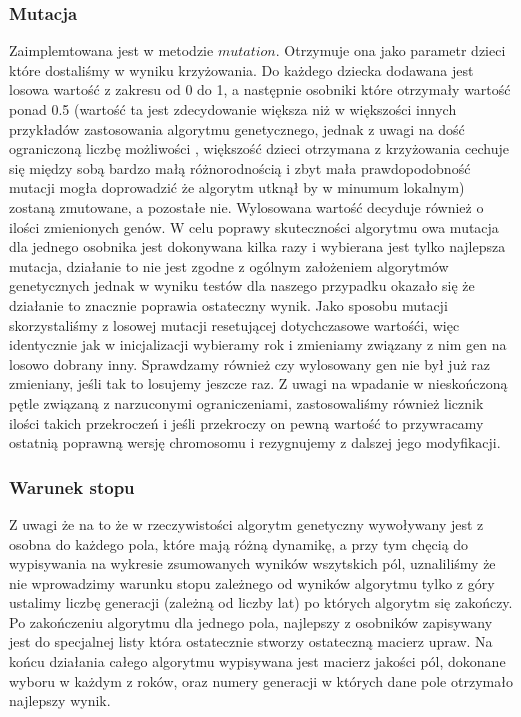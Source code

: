 \documentclass{article}
\begin{document}
\subsubsection{Mutacja}
Zaimplemtowana jest w metodzie $mutation$. Otrzymuje ona jako parametr dzieci  które dostaliśmy w wyniku krzyżowania. Do każdego dziecka dodawana jest losowa wartość z zakresu od 0 do 1, a następnie osobniki które otrzymały wartość ponad 0.5 (wartość ta jest zdecydowanie większa niż w większości innych przykładów zastosowania algorytmu genetycznego, jednak z uwagi na dość ograniczoną liczbę możliwości , większość dzieci otrzymana z krzyżowania cechuje się między sobą bardzo małą różnorodnością i zbyt mała prawdopodobność mutacji mogła doprowadzić że algorytm utknął by w minumum lokalnym)  zostaną zmutowane, a pozostałe nie. Wylosowana wartość decyduje również o ilości zmienionych genów. W celu poprawy skuteczności algorytmu owa mutacja dla jednego osobnika jest dokonywana kilka razy i wybierana jest tylko najlepsza mutacja, działanie to nie jest zgodne z ogólnym założeniem algorytmów genetycznych jednak w wyniku testów dla naszego przypadku okazało się że działanie to znacznie poprawia ostateczny wynik. Jako sposobu mutacji skorzystaliśmy z losowej mutacji resetującej dotychczasowe wartośći, więc identycznie jak w inicjalizacji wybieramy rok i zmieniamy związany z nim gen na losowo dobrany inny. Sprawdzamy również czy wylosowany gen nie był już raz zmieniany, jeśli tak to losujemy jeszcze raz. Z uwagi na wpadanie w nieskończoną pętle związaną z narzuconymi ograniczeniami, zastosowaliśmy również licznik ilości takich przekroczeń i jeśli przekroczy on pewną wartość to przywracamy ostatnią poprawną wersję chromosomu i rezygnujemy z dalszej jego modyfikacji.

\subsubsection{Warunek stopu}
Z uwagi że na to że w rzeczywistości algorytm genetyczny wywoływany jest z osobna do każdego pola, które mają różną dynamikę, a przy tym chęcią do wypisywania na wykresie zsumowanych wyników wszytskich pól, uznaliliśmy że nie wprowadzimy warunku stopu zależnego od wyników algorytmu tylko z góry ustalimy liczbę generacji (zależną od liczby lat) po których algorytm się zakończy. Po zakończeniu algorytmu dla jednego pola, najlepszy z osobników zapisywany jest do specjalnej listy która ostatecznie stworzy ostateczną macierz upraw. Na końcu działania całego algorytmu wypisywana jest macierz jakości pól, dokonane wyboru w każdym z roków, oraz numery generacji w których dane pole otrzymało najlepszy wynik.
\end{document}

